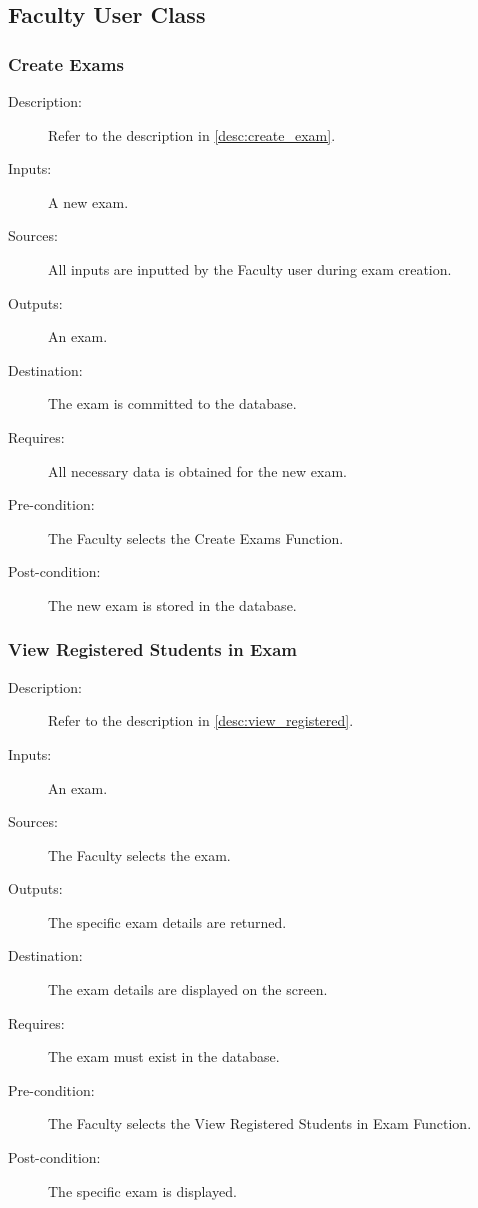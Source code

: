\subsection{Faculty User Class}

\subsubsection{\large Create Exams} 
\begin{boxed} %
\begin{description}
\item[Description:]
   Refer to the description in \autoref{desc:create_exam}.
\item[Inputs:]
   A new exam.
\item[Sources:]
   All inputs are inputted by the Faculty user during exam creation.
\item[Outputs:]
   An exam.
\item[Destination:]
   The exam is committed to the database.
\item[Requires:]
   All necessary data is obtained for the new exam.
\item[Pre-condition:]
   The Faculty selects the Create Exams Function.
\item[Post-condition:]
   The new exam is stored in the database.
\end{description}
\end{boxed} %

\subsubsection{\large View Registered Students in Exam} 
\begin{boxed} %
\begin{description}
\item[Description:]
   Refer to the description in \autoref{desc:view_registered}.
\item[Inputs:]
   An exam.
\item[Sources:]
   The Faculty selects the exam.
\item[Outputs:]
   The specific exam details are returned.
\item[Destination:]
   The exam details are displayed on the screen.
\item[Requires:]
   The exam must exist in the database.
\item[Pre-condition:]
   The Faculty selects the View Registered Students in Exam Function.
\item[Post-condition:]
   The specific exam is displayed.
\end{description}
\end{boxed} %

